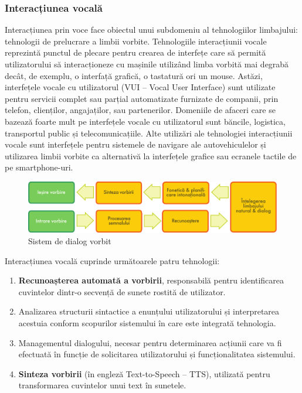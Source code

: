 \begin{multicols}{2}
\subsubsection{Interacțiunea vocală}

Interacțiunea prin voce face obiectul unui subdomeniu al tehnologiilor limbajului: tehnologii de prelucrare a limbii vorbite. Tehnologiile interacțiunii vocale reprezintă punctul de plecare pentru crearea de interfețe care să permită utilizatorului să interacționeze cu mașinile utilizând limba vorbită mai degrabă decât, de exemplu, o interfață grafică, o tastatură ori un mouse. Astăzi, interfețele vocale cu utilizatorul (VUI -- Vocal User Interface) sunt utilizate pentru servicii complet sau parțial automatizate furnizate de companii, prin telefon, clienților, angajaților, sau partenerilor. Domeniile de afaceri care se bazează foarte mult pe interfețele vocale cu utilizatorul sunt băncile, logistica, transportul public și telecomunicațiile. Alte utilizări ale tehnologiei interacțiunii vocale sunt interfețele pentru sistemele de navigare ale autovehiculelor și utilizarea limbii vorbite ca alternativă la interfețele grafice sau ecranele tactile de pe smartphone-uri.

\begin{figure}[htb]
\center 
\includegraphics[width=\textwidth]{../_media/romanian/simple_speech-based_dialogue_architecture}
\caption{Sistem de dialog vorbit}
\label{fig:dialoguearch_de}
\vspace{-15mm}
\end{figure}

Interacțiunea vocală cuprinde următoarele patru tehnologii:

\begin{enumerate}
\item \textbf{Recunoașterea automată a vorbirii}, responsabilă pentru identificarea cuvintelor \mbox{dintr-o} secvență de sunete rostită de utilizator.
\item Analizarea structurii sintactice a enunțului utilizatorului și interpretarea acestuia conform scopurilor sistemului în care este integrată tehnologia.
\item Managementul dialogului, necesar pentru determinarea acțiunii care va fi efectuată în funcție de solicitarea utilizatorului și funcționalitatea sistemului.
\item \textbf{Sinteza vorbirii} (în engleză Text-to-Speech -- TTS), utilizată pentru transformarea cuvintelor unui text în sunetele.
\end{enumerate}


\end{multicols}
